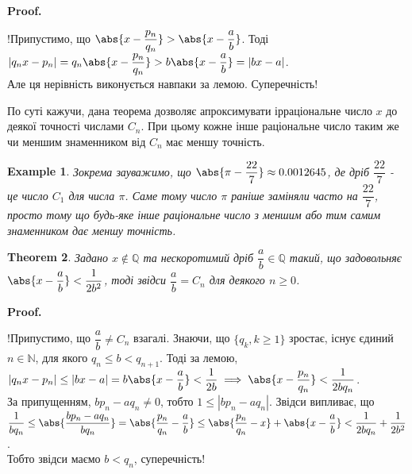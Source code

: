 \documentclass[a4paper, 10pt]{article}
\makeatletter
\theoremstyle{theoremdd}
\newtheorem{theorem}{Theorem}[subsection]
\theoremstyle{theoremdd}
\theoremstyle{theoremdd}
\theoremstyle{theoremdd}
\newtheorem{example}[theorem]{Example}
\theoremstyle{theoremdd}
\theoremstyle{theoremdd}
\theoremstyle{theoremdd}
\theoremstyle{theoremdd}
\renewenvironment{proof}[1][Proof.\\]{\par
\pushQED{\hfill \qed}%
\normalfont \topsep6\p@\@plus6\p@\relax
\trivlist
\item\relax
{\bfseries
#1\@addpunct{.}}\hspace\labelsep\ignorespaces
}{%
\popQED\endtrivlist\@endpefalse
}
\makeatother
\begin{document}
\begin{proof}
!Припустимо, що $\abs{x - \dfrac{p_n}{q_n}} > \abs{x - \dfrac{a}{b}}$. Тоді\\
$|q_n x - p_n| = q_n \abs{x - \dfrac{p_n}{q_n}} > b \abs{x - \dfrac{a}{b}} = |bx-a|$.\\
Але ця нерівність виконується навпаки за лемою. Суперечність!
\end{proof}

По суті кажучи, дана теорема дозволяє апроксимувати ірраціональне число $x$ до деякої точності числами $C_n$. При цьому кожне інше раціональне число таким же чи меншим знаменником від $C_n$ має меншу точність.

\begin{example}
Зокрема зауважимо, що $\abs{\pi - \dfrac{22}{7}} \approx 0.0012645$, де дріб $\dfrac{22}{7}$ - це число $C_1$ для числа $\pi$. Саме тому число $\pi$ раніше заміняли часто на $\dfrac{22}{7}$, просто тому що будь-яке інше раціональне число з меншим або тим самим знаменником дає меншу точність.
\end{example}

\begin{theorem}
\label{rational is convergent if estimation holds}
Задано $x \not\in \mathbb{Q}$ та нескоротимий дріб $\dfrac{a}{b} \in \mathbb{Q}$ такий, що задовольняє $\abs{x - \dfrac{a}{b}} < \dfrac{1}{2b^2}$, тоді звідси $\dfrac{a}{b} = C_n$ для деякого $n \geq 0$.
\end{theorem}

\begin{proof}
!Припустимо, що $\dfrac{a}{b} \neq C_n$ взагалі. Знаючи, що $\{q_k, k \geq 1\}$ зростає, існує єдиний $n \in \mathbb{N}$, для якого $q_n \leq b < q_{n+1}$. Тоді за лемою,\\
$|q_n x - p_n| \leq |bx - a| = b \abs{x - \dfrac{a}{b}} < \dfrac{1}{2b} \implies \abs{x - \dfrac{p_n}{q_n}} < \dfrac{1}{2bq_n}$.\\
За припущенням, $bp_n - aq_n \neq 0$, тобто $1 \leq |bp_n - aq_n|$. Звідси випливає, що\\
$\dfrac{1}{bq_n} \leq \abs{\dfrac{bp_n - aq_n}{bq_n}} = \abs{\dfrac{p_n}{q_n} - \dfrac{a}{b}} \leq \abs{\dfrac{p_n}{q_n} - x} + \abs{x - \dfrac{a}{b}} < \dfrac{1}{2bq_n} + \dfrac{1}{2b^2}$.\\
Тобто звідси маємо $b < q_n$, суперечність! 
\end{proof}
\end{document}
